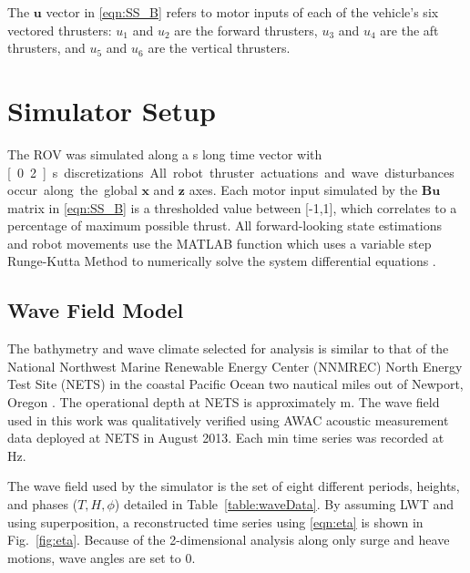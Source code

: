 \documentclass[letterpaper, 10 pt, conferences]{IEEEconf}  %
\renewcommand{\vec}[1]{\mathbf{#1}}
\begin{document}
The $\vec{u}$ vector in \eqref{eqn:SS_B} refers to motor inputs of each of the vehicle's six vectored thrusters: $u_1$ and $u_2$ are the forward thrusters, $u_3$ and $u_4$ are the aft thrusters, and $u_5$ and $u_6$ are the vertical thrusters.

\section{Simulator Setup}
\label{sec:sim}

The ROV was simulated along a \unit[240]{s} long time vector with \unit[0.2]{s} discretizations. All robot thruster actuations and wave disturbances occur along the global $\vec{x}$ and $\vec{z}$ axes. Each motor input simulated by the $\vec{B}\vec{u}$ matrix in \eqref{eqn:SS_B} is a thresholded value between [-1,1], which correlates to a percentage of maximum possible thrust. All forward-looking state estimations and robot movements use the MATLAB function  which uses a variable step Runge-Kutta Method to numerically solve the system differential equations \cite{ode45}.

\subsection{Wave Field Model} 

The bathymetry and wave climate selected for analysis is similar to that of the National Northwest Marine Renewable Energy Center (NNMREC) North Energy Test Site (NETS) in the coastal Pacific Ocean two nautical miles out of Newport, Oregon \cite{ling}. The operational depth at NETS is approximately \unit[50]{m}. The wave field used in this work was qualitatively verified using AWAC acoustic measurement data deployed at NETS in August 2013. Each \unit[40]{min} time series was recorded at \unit[2]{Hz}.

The wave field used by the simulator is the set of eight different periods, heights, and phases ($T, H, \phi$) detailed in Table~\ref{table:waveData}. By assuming LWT and using superposition, a reconstructed time series using \eqref{eqn:eta} is shown in Fig.~\ref{fig:eta}. Because of the 2-dimensional analysis along only surge and heave motions, wave angles are set to 0.
\end{document}
